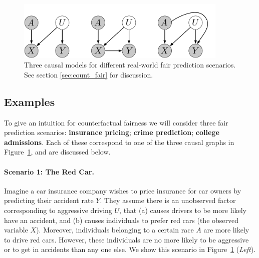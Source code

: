 
\begin{figure}[th]
\begin{center}
\vspace{-2ex}
\centerline{\includegraphics[width=0.9\textwidth]{simple_models_no_q2}}
\vspace{-2ex}
\caption{Three causal models for different real-world fair prediction scenarios.\label{figure.simple_models} See section \ref{sec:count_fair} for discussion.}
\vspace{-2ex}
\end{center}
\end{figure}

\subsection{Examples}
To give an intuition for counterfactual fairness we will consider three %
fair prediction scenarios: \textbf{insurance pricing}; \textbf{crime prediction}; \textbf{college admissions}. Each of these correspond to one of the three causal graphs in Figure~\ref{figure.simple_models}, and are discussed below.
%
\paragraph{Scenario 1: The Red Car.}
Imagine a car insurance company wishes to price insurance for car owners by
predicting their accident rate $Y$. They assume there is an
unobserved factor corresponding to aggressive driving $U$, that (a) causes
drivers to be more likely have an accident, and (b) causes individuals to prefer red cars (the observed
variable $X$). Moreover, individuals belonging to a
certain race $A$ are more likely to drive red cars. However, these individuals are no more likely to be aggressive or to get in accidents than any one else. We show this scenario in Figure~\ref{figure.simple_models} (\emph{Left}).

